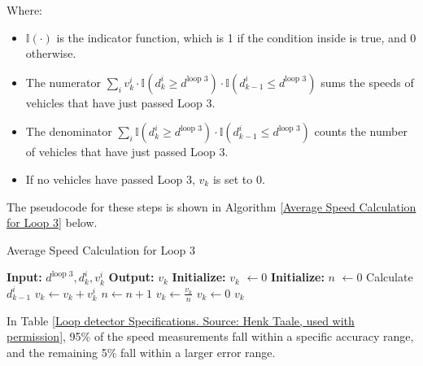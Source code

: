 Where:
\begin{itemize}
    \item \(\mathbb{I}(\cdot)\) is the indicator function, which is 1 if the condition inside is true, and 0 otherwise.
    \item The numerator \(\sum_{i} v_{k}^i \cdot \mathbb{I}(d_{k}^i \geq d^{\text{loop 3}}) \cdot \mathbb{I}(d_{k-1}^i \leq d^{\text{loop 3}})\) sums the speeds of vehicles that have just passed Loop 3.
    \item The denominator \(\sum_{i} \mathbb{I}(d_{k}^i \geq d^{\text{loop 3}}) \cdot \mathbb{I}(d_{k-1}^i \leq d^{\text{loop 3}})\) counts the number of vehicles that have just passed Loop 3.
    \item If no vehicles have passed Loop 3, \(v_k\) is set to 0.
\end{itemize}



The pseudocode for these steps is shown in Algorithm \ref{Average Speed Calculation for Loop 3} below.
\begin{algorithm}[h]
\caption{Average Speed Calculation for Loop 3}\label{Average Speed Calculation for Loop 3}
\begin{algorithmic}[1]
    \State \textbf{Input:} $d^{\text{loop 3}}, d_{k}^i, v_{k}^i$
    \State \textbf{Output:} $v_k$
    \State \textbf{Initialize:} $v_k$ $\gets 0$
    \State \textbf{Initialize:} $n$ $\gets 0$ 
            \State Calculate $d_{k-1}^i$
                \State $v_k \gets v_k + v_{k}^i$
                \State $n \gets n + 1$
            \EndIf
        \EndIf
    \EndFor
        \State $v_k \gets \frac{v_k}{n}$
    \Else
        \State $v_k \gets 0$ 
    \EndIf
    \State \Return $v_k$
\end{algorithmic}
\end{algorithm}





In Table \ref{Loop detector Specifications. Source: Henk Taale, used with permission}, 95\% of the speed measurements fall within a specific accuracy range, and the remaining 5\% fall within a larger error range. 

